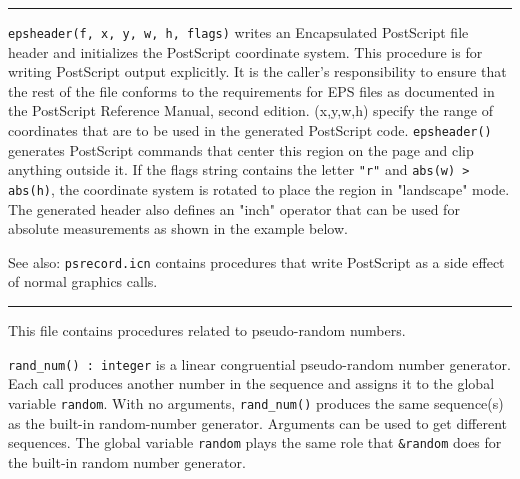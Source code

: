 \vspace{0.25cm}\hrule{}

\texttt{epsheader(f, x, y, w, h, flags)} writes an Encapsulated
PostScript file header and initializes the PostScript coordinate
system. This procedure is for writing PostScript output
explicitly.
 It is the caller's
responsibility to ensure that the rest of the file conforms to the
requirements for EPS files as documented in the PostScript Reference
Manual, second edition. (x,y,w,h) specify the range of coordinates that
are to be used in the generated PostScript code. \texttt{epsheader()}
generates PostScript commands that center this region
on the page and clip anything outside it. If the flags string contains
the letter \texttt{"r"} and \texttt{abs(w)
{\textgreater} abs(h)}, the coordinate system is rotated to place the
region in "landscape" mode. The generated
header also defines an "inch" operator that
can be used for absolute measurements as shown in the example below.


See also: \texttt{psrecord.icn} contains procedures that
write PostScript as a side effect of normal graphics calls.

\vspace{0.25cm}\hrule{}

This file contains procedures related to pseudo-random numbers.

\texttt{rand\_num() : integer} is a linear congruential pseudo-random
number generator. Each call produces
another number in the sequence and assigns it to the global
variable \texttt{random}. With no arguments, \texttt{rand\_num()}
produces the same sequence(s) as the built-in
random-number generator. Arguments can
be used to get different sequences. The global variable \texttt{random}
plays the same role that \texttt{\&random} does for
the built-in random
number generator.

